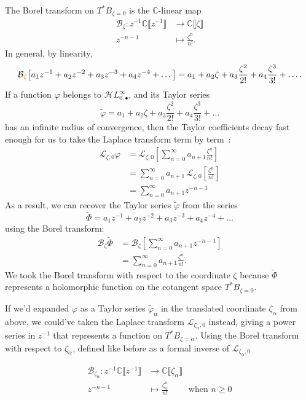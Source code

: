 \documentclass{article}
\newcommand{\singexp}[2]{\mathcal{H}L^\infty_{#1, #2}}
\newcommand{\singexpalg}[1]{\singexp{#1}{\bullet}}
\theoremstyle{definition}
\newcommand{\maps}{\colon}
\newcommand{\C}{\mathbb{C}}
\newcommand{\series}[1]{\tilde{#1}}
\newcommand{\laplace}{\mathcal{L}}
\newcommand{\borel}{\mathcal{B}}
\begin{document}
The Borel transform on $T^*B_{\zeta = 0}$ is the $\C$-linear map
\begin{align*}
\borel_\zeta \maps z^{-1} \C \llbracket z^{-1} \rrbracket & \to \C \llbracket \zeta \rrbracket \\
z^{-n-1} & \mapsto \frac{\zeta^n}{n!}.
\end{align*}
In general, by linearity,
\begin{align*}
\borel\textcolor{orange}{_\zeta}\big[a_1 z^{-1} + a_2 z^{-2} + a_3 z^{-3} + a_4 z^{-4} + \ldots \big] = a_1 + a_2 \zeta + a_3 \frac{\zeta^2}{2!} + a_4 \frac{\zeta^3}{3!} + \ldots.
\end{align*}
If a function $\varphi$ belongs to $\singexpalg{0}$, and its Taylor series
\[ \series{\varphi} = a_1 + a_2 \zeta + a_3 \frac{\zeta^2}{2!} + a_4 \frac{\zeta^3}{3!} + \ldots \]
has an infinite radius of convergence, then the Taylor coefficients decay fast enough for us to take the Laplace transform term by term~\cite[Theorem 5.20]{diverg-resurg-i}:
\begin{align*}
  \laplace_{\zeta, 0}\varphi&=\laplace_{\zeta,0}\left[\sum_{n=0}^\infty a_{n+1}\frac{\zeta^n}{n!}\right]\\
  &=\sum_{n=0}^\infty a_{n+1}\,\laplace_{\zeta,0}\left[\frac{\zeta^n}{n!}\right]\\
  &=\sum_{n=0}^\infty a_{n+1}z^{-n-1}
\end{align*}
As a result, we can recover the Taylor series $\series{\varphi}$ from the series
\[ \series{\Phi} = a_1 z^{-1} + a_2 z^{-2} + a_3 z^{-3} + a_4 z^{-4} + \ldots \]
using the Borel transform:
\begin{align*}
\borel_\zeta \series{\Phi}&=\borel_\zeta\left[\sum_{n=0}^\infty a_{n+1}z^{-n-1}\right]\\
&=\sum_{n=0}^\infty a_{n+1}\frac{\zeta^n}{n!}.
\end{align*}
We took the Borel transform with respect to the coordinate $\zeta$ because $\series{\Phi}$ represents a holomorphic function on the cotangent space $T^*B_{\zeta = 0}$.

If we'd expanded $\varphi$ as a Taylor series $\series{\varphi}_\alpha$ in the translated coordinate $\zeta_\alpha$ from above, we could've taken the Laplace transform $\laplace_{\zeta_\alpha,0}$ instead, giving a power series in $z^{-1}$ that represents a function on $T^*B_{\zeta = \alpha}$. Using the Borel transform with respect to $\zeta_\alpha$, defined like before as a formal inverse of $\laplace_{\zeta_\alpha,0}$

\begin{align*}
     \borel_{\zeta_\alpha}\colon z^{-1}\C\llbracket z^{-1}\rrbracket &\to \C\llbracket \zeta_\alpha \rrbracket  \\
     z^{-n-1}& \mapsto \frac{\zeta_\alpha^n}{n!} \qquad \text{ when } n\geq 0
 \end{align*}
\end{document}
